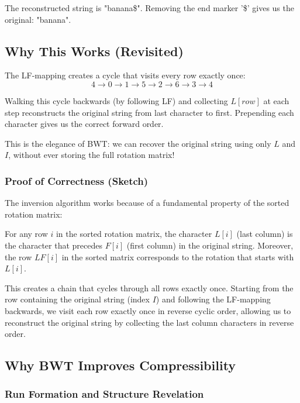 \begin{examplebox}[Step-by-Step Inversion of "annb\$aa" with I=4]
The reconstructed string is "banana\$". Removing the end marker '\$' gives us the original: "banana".

\subsection*{Why This Works (Revisited)}

The LF-mapping creates a cycle that visits every row exactly once:
\[
4 \rightarrow 0 \rightarrow 1 \rightarrow 5 \rightarrow 2 \rightarrow 6 \rightarrow 3 \rightarrow 4
\]

Walking this cycle backwards (by following LF) and collecting \(L[row]\) at each step reconstructs the original string from last character to first. Prepending each character gives us the correct forward order.

This is the elegance of BWT: we can recover the original string using only \(L\) and \(I\), without ever storing the full rotation matrix!

\end{examplebox}

\subsubsection{Proof of Correctness (Sketch)}

The inversion algorithm works because of a fundamental property of the sorted rotation matrix:

\begin{theorem}
For any row \(i\) in the sorted rotation matrix, the character \(L[i]\) (last column) is the character that precedes \(F[i]\) (first column) in the original string. Moreover, the row \(LF[i]\) in the sorted matrix corresponds to the rotation that starts with \(L[i]\).
\end{theorem}

This creates a chain that cycles through all rows exactly once. Starting from the row containing the original string (index \(I\)) and following the LF-mapping backwards, we visit each row exactly once in reverse cyclic order, allowing us to reconstruct the original string by collecting the last column characters in reverse order.

\subsection{Why BWT Improves Compressibility}

\subsubsection{Run Formation and Structure Revelation}

